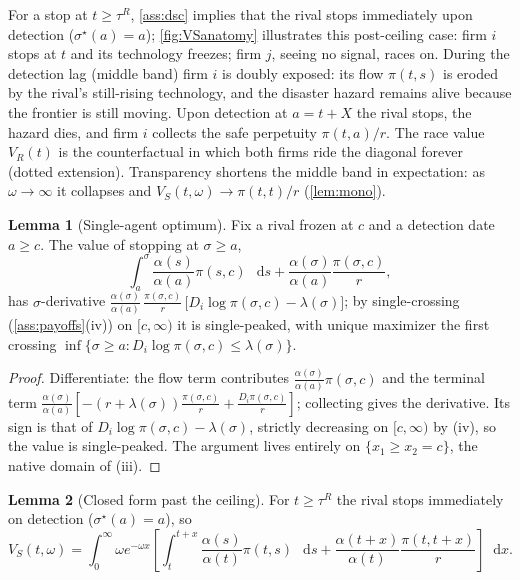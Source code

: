 \documentclass[12pt,reqno]{article}
\newcommand{\de}{\mathop{}\!\mathrm{d}}
\theoremstyle{definition} \newtheorem{example}{Example}
\theoremstyle{definition} \newtheorem{condition}{Condition}
\theoremstyle{definition} \newtheorem{corollary}{Corollary}
\theoremstyle{definition} \newtheorem{claim}{Claim}
\theoremstyle{definition} \newtheorem{definition}{Definition}
\theoremstyle{definition} \newtheorem{conjecture}{Conjecture}
\theoremstyle{definition} \newtheorem{Lemma}{Lemma}
\theoremstyle{definition} \newtheorem{lemma}{Lemma}
\theoremstyle{plain} \newtheorem{theorem}{Theorem}
\theoremstyle{definition} \newtheorem{assumption}{Assumption}
\theoremstyle{definition} \newtheorem*{assumptionnonumber}{Assumption}
\theoremstyle{definition} \newtheorem*{theoremNoNumber}{Proposition}
\theoremstyle{definition}
\theoremstyle{definition}\newtheorem{proposition}{Proposition}
\theoremstyle{definition} \newtheorem{result}{Result}
\theoremstyle{definition} \newtheorem*{definitionNoNumber}{Definition}
\theoremstyle{definition} \newtheorem{Definition}{Definition}
\theoremstyle{definition} \newtheorem*{DefinitionNoNumber}{Definition}
\theoremstyle{definition} \newtheorem*{fact}{Fact}
\theoremstyle{definition} \newtheorem*{property}{Property}
\theoremstyle{definition} \newtheorem{remark}{Remark}
\begin{document}
For a stop at $t\ge\tau^R$, \cref{ass:dsc} implies that the rival stops immediately upon detection ($\sigma^\star(a)=a$); \cref{fig:VSanatomy} illustrates this post-ceiling case: firm $i$ stops at $t$ and its technology freezes; firm $j$, seeing no signal, races on. During the detection lag (middle band) firm $i$ is doubly exposed: its flow $\pi(t,s)$ is eroded by the rival's still-rising technology, and the disaster hazard remains alive because the frontier is still moving. Upon detection at $a=t+X$ the rival stops, the hazard dies, and firm $i$ collects the safe perpetuity $\pi(t,a)/r$. The race value $V_R(t)$ is the counterfactual in which both firms ride the diagonal forever (dotted extension). Transparency shortens the middle band in expectation: as $\omega\to\infty$ it collapses and $V_S(t,\omega)\to\pi(t,t)/r$ (\cref{lem:mono}).




\begin{lemma}[Single-agent optimum]\label{lem:R}
Fix a rival frozen at $c$ and a detection date $a\ge c$. The value of stopping at $\sigma\ge a$,
\[
\int_a^\sigma\frac{\alpha(s)}{\alpha(a)}\pi(s,c)\,\de s+\frac{\alpha(\sigma)}{\alpha(a)}\frac{\pi(\sigma,c)}{r},
\]
has $\sigma$-derivative $\frac{\alpha(\sigma)}{\alpha(a)}\,\frac{\pi(\sigma,c)}{r}\,\big[D_i\log\pi(\sigma,c)-\lambda(\sigma)\big]$; by single-crossing (\cref{ass:payoffs}(iv)) on $[c,\infty)$ it is single-peaked, with unique maximizer the first crossing $\inf\{\sigma\ge a:D_i\log\pi(\sigma,c)\le\lambda(\sigma)\}$.
\end{lemma}

\begin{proof}
Differentiate: the flow term contributes $\frac{\alpha(\sigma)}{\alpha(a)}\pi(\sigma,c)$ and the terminal term $\frac{\alpha(\sigma)}{\alpha(a)}[-(r+\lambda(\sigma))\frac{\pi(\sigma,c)}r+\frac{D_i \pi(\sigma,c)}r]$; collecting gives the derivative. Its sign is that of $D_i\log\pi(\sigma,c)-\lambda(\sigma)$, strictly decreasing on $[c,\infty)$ by (iv), so the value is single-peaked. The argument lives entirely on $\{x_1\ge x_2=c\}$, the native domain of (iii).
\end{proof}

\begin{lemma}[Closed form past the ceiling]\label{lem:VSclosed}
For $t\ge\tau^R$ the rival stops immediately on detection ($\sigma^\star(a)=a$), so
\[
V_S(t,\omega)=\int_0^\infty\!\omega e^{-\omega x}\left[\int_t^{t+x}\frac{\alpha(s)}{\alpha(t)}\pi(t,s)\,\de s+\frac{\alpha(t+x)}{\alpha(t)}\frac{\pi(t,t+x)}{r}\right]\de x .
\]
\end{lemma}
\end{document}
